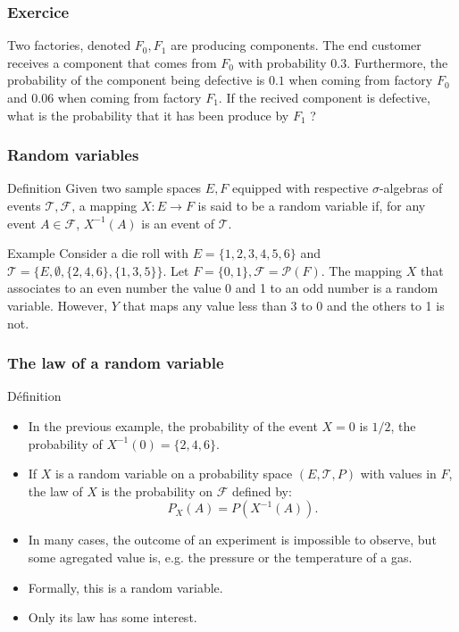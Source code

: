 \begin{frame}
    \frametitle{Exercice}
Two factories, denoted $F_0, F_1$ are producing components.  The end customer 
receives a component that comes from $F_0$ with probability $0.3$. Furthermore,
the probability of the component being defective is $0.1$ when coming from factory $F_0$
and $0.06$ when coming from factory $F_1$. If the recived component is defective,
what is the probability that it has been produce by $F_1$ ?

\end{frame}
\begin{frame}
    \frametitle{Random variables}
\begin{block}{Definition}
    Given two sample spaces $E,F$ equipped with respective $\sigma$-algebras of events 
    $\mathcal{T},\mathcal{F}$, a mapping $X \colon E \to F$ is said to be 
    a random variable if, for any event $A \in \mathcal{F}$, $X^{-1}\left( A \right)$
    is an event of $\mathcal{T}.$
\end{block}
\begin{block}{Example}
    Consider a die roll with $E=\{1,2,3,4,5,6\}$ and 
    $\mathcal{T}=\{E,\emptyset,\{2,4,6\},\{1,3,5\}\}$. Let $F=\{0,1\}, \mathcal{F}=\mathcal{P}(F).$
    The mapping $X$ that associates to an even number the value 0 and 1 to an odd number
    is a random variable. However, $Y$ that maps any value less than 3 to 0 and the
    others to 1 is not.
\end{block}
\end{frame}
\begin{frame}
    \frametitle{The law of a random variable}
\begin{block}{Définition}
    \begin{itemize}
        \item<+-> In the previous example,  
        the probability of the event $X=0$ is $1/2$, the probability of  
        $X^{-1}\left( 0 \right)=\{2,4,6\}.$
        \item<+-> If $X$ is a random variable on a probability space $\left( E,\mathcal{T},P \right)$
        with values in $F$, the law of $X$ is the probability on $\mathcal{F}$ defined by:
        \begin{equation}
            P_X \left( A \right) = P \left( X^{-1}(A) \right).
        \end{equation}
    \item<+-> In many cases, the outcome of an experiment is impossible to observe, but 
    some agregated value is, e.g. the pressure or the temperature of a gas.
    \item<+-> Formally, this is a random variable.
    \item<+-> Only its law has some interest.
   \end{itemize} 
\end{block}    
\end{frame}

